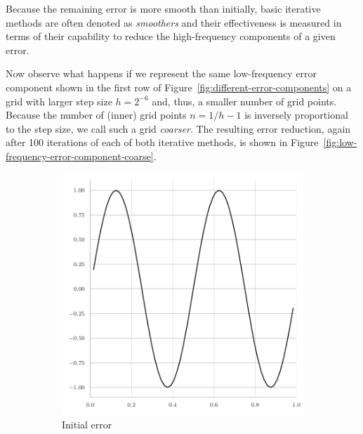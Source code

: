 Because the remaining error is more smooth than initially, basic iterative methods are often denoted as \emph{smoothers} and their effectiveness is measured in terms of their capability to reduce the high-frequency components of a given error. 

Now observe what happens if we represent the same low-frequency error component shown in the first row of Figure~\ref{fig:different-error-components} on a grid with larger step size $h = 2^{-6}$ and, thus, a smaller number of grid points.
Because the number of (inner) grid points $n = 1/h - 1$ is inversely proportional to the step size, we call such a grid \emph{coarser}.
The resulting error reduction, again after 100 iterations of each of both iterative methods, is shown in Figure~\ref{fig:low-frequency-error-component-coarse}. 
\begin{figure}
	\begin{subfigure}[b]{0.32\textwidth}
	\centering
	\includegraphics[width=\textwidth]{figures/error_plots//initial_error_jacobi_4pi_coarse.pdf}
	\caption{Initial error}
\end{subfigure}
\hfill
\begin{subfigure}[b]{0.32\textwidth}
	\centering

\end{subfigure}
\end{figure}
